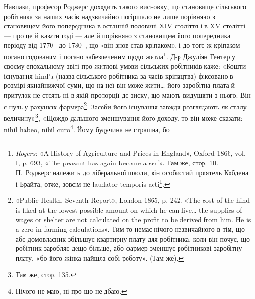 Навпаки, професор Роджерс доходить такого висновку, що
становище сільського робітника за наших часів надзвичайно
погіршало не лише порівняно з становищем його попередника
в останній половині XIV століття і в XV столітті — про це й
казати годі — але й порівняно з становищем його попередника
періоду від 1770~ до 1780~, що «він знов став кріпаком», і
до того ж кріпаком погано годованим і погано забезпеченим щодо
житла\footnote{
\emph{Rogers}: «A History of Agriculture and Prices in England», Oxford
1866, vol. I, p. 693, «The peasant has again become a serf». Там же, стор. 10.
П.~Роджерс належить до ліберальної школи, він особистий приятель
Кобдена і Брайта, отже, зовсім не laudator temporis acti\footnote*{
хвалій минулих часів. 
}.
}. Д-р Джуліян Гентер у своєму епохальному звіті про
житлові умови сільських робітників каже: «Кошти існування
hind’a (назва сільського робітника за часів кріпацтва) фіксовано
в розмірі якнайнижчої суми, що на неї він може жити\dots{} його
заробітна плата й притулок не стоять ні в якій пропорції до зиску,
що мають видушити з нього. Він є нуль у рахунках фармера\footnote{
«Public Health. Seventh Report», London 1865, p. 242. «The cost of
the hind is fiked at the lowest possible amount on which he can live\dots{} the
supplies of wages or shelter are not calculated on the profit to be derived
from him. He is a zero in farming calculations». Тим то немає нічого незвичайного
в тім, що або домовласник збільшує квартирну плату для робітника,
коли він почує, що робітник заробляє дещо більше, або фармер
зменшує робітникові заробітну плату, «бо його жінка найшла собі
роботу». (Там же).
}.
Засоби його існування завжди розглядають як сталу величину»\footnote{
Там же, стор. 135.
},
«Щождо дальшого зменшування його доходу, то він може сказати:
nihil habeo, nihil curo\footnote*{
Нічого не маю, ні про що не дбаю. 
}. Йому будучина не страшна, бо
\parbreak{}  %
